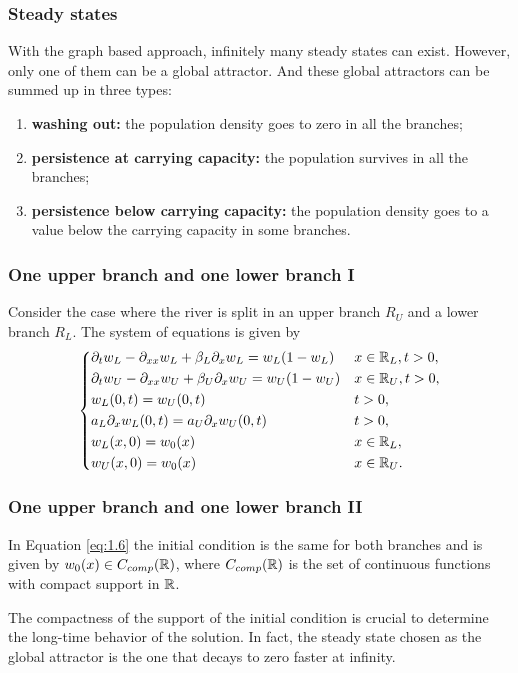 \begin{frame}
    \frametitle{Steady states}
    With the graph based approach, infinitely many steady states can exist. However, only one of them can be a global attractor. And these global attractors can be summed up in three types:
    \begin{enumerate}
        \item \textbf{washing out:} the population density goes to zero in all the branches;
        \item \textbf{persistence at carrying capacity:} the population survives in all the branches;
        \item \textbf{persistence below carrying capacity:} the population density goes to a value below the carrying capacity in some branches.
    \end{enumerate}
\end{frame}


\begin{frame}
    \frametitle{One upper branch and one lower branch I}
    Consider the case where the river is split in an upper branch \(R_U\) and a lower branch \(R_L\). The system of equations is given by
    \begin{equation}
        \begin{dcases}
            \partial_t w_L - \partial_{xx}w_L + \beta_L \partial_x w_L = w_L(1 - w_L) &  x \in \mathbb{R}_L, t > 0, \\
            \partial_t w_U - \partial_{xx}w_U + \beta_U \partial_x w_U = w_U(1 - w_U) & x \in \mathbb{R}_U, t > 0, \\
            w_L(0, t) = w_U(0, t) &  t > 0, \\
            a_L \partial_x w_L(0, t) = a_U \partial_x w_U(0, t) &  t > 0, \\
            w_L(x, 0) = w_{0}(x) &  x \in \mathbb{R}_L, \\
            w_U(x, 0) = w_{0}(x) &  x \in \mathbb{R}_U.
        \end{dcases}
        \label{eq:1.6}
    \end{equation}
\end{frame}


\begin{frame}
    \frametitle{One upper branch and one lower branch II}
    In Equation \eqref{eq:1.6} the initial condition is the same for both branches and is given by \(w_0(x) \in C_{comp}(\mathbb{R})\), where \(C_{comp}(\mathbb{R})\) is the set of continuous functions with compact support in \(\mathbb{R}\).

    The compactness of the support of the initial condition is crucial to determine the long-time behavior of the solution. In fact, the steady state chosen as the global attractor is the one that decays to zero faster at infinity.
\end{frame}

